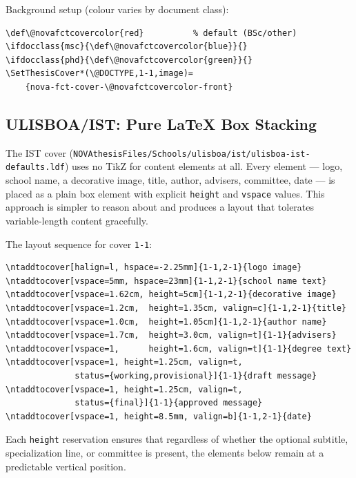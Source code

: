 Background setup (colour varies by document class):
\begin{verbatim}
\def\@novafctcovercolor{red}          % default (BSc/other)
\ifdocclass{msc}{\def\@novafctcovercolor{blue}}{}
\ifdocclass{phd}{\def\@novafctcovercolor{green}}{}
\SetThesisCover*(\@DOCTYPE,1-1,image)=
    {nova-fct-cover-\@novafctcovercolor-front}
\end{verbatim}


\subsection{ULISBOA/IST: Pure LaTeX Box Stacking}
\label{sec:covers_ist}

The IST cover
(\verb!NOVAthesisFiles/Schools/ulisboa/ist/ulisboa-ist-defaults.ldf!)
uses no TikZ for content elements at all.  Every element — logo, school
name, a decorative image, title, author, advisers, committee, date — is
placed as a plain box element with explicit \texttt{height} and
\texttt{vspace} values.  This approach is simpler to reason about and
produces a layout that tolerates variable-length content gracefully.

The layout sequence for cover \texttt{1-1}:
\begin{verbatim}
\ntaddtocover[halign=l, hspace=-2.25mm]{1-1,2-1}{logo image}
\ntaddtocover[vspace=5mm, hspace=23mm]{1-1,2-1}{school name text}
\ntaddtocover[vspace=1.62cm, height=5cm]{1-1,2-1}{decorative image}
\ntaddtocover[vspace=1.2cm,  height=1.35cm, valign=c]{1-1,2-1}{title}
\ntaddtocover[vspace=1.0cm,  height=1.05cm]{1-1,2-1}{author name}
\ntaddtocover[vspace=1.7cm,  height=3.0cm, valign=t]{1-1}{advisers}
\ntaddtocover[vspace=1,      height=1.6cm, valign=t]{1-1}{degree text}
\ntaddtocover[vspace=1, height=1.25cm, valign=t,
              status={working,provisional}]{1-1}{draft message}
\ntaddtocover[vspace=1, height=1.25cm, valign=t,
              status={final}]{1-1}{approved message}
\ntaddtocover[vspace=1, height=8.5mm, valign=b]{1-1,2-1}{date}
\end{verbatim}

Each \texttt{height} reservation ensures that regardless of whether the
optional subtitle, specialization line, or committee is present, the
elements below remain at a predictable vertical position.


